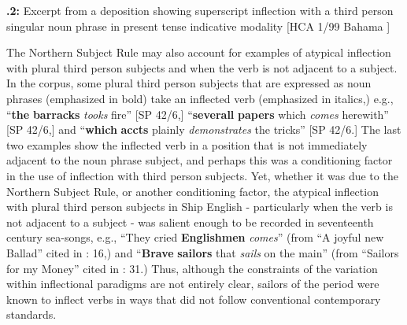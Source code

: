  

\textbf{.2:} Excerpt from a deposition showing superscript inflection with a third person singular noun phrase in present tense indicative modality [HCA 1/99 Bahama \citealt{Islands1722}]

The Northern Subject Rule may also account for examples of atypical inflection with plural third person subjects and when the verb is not adjacent to a subject. In the corpus, some plural third person subjects that are expressed as noun phrases (emphasized in bold) take an inflected verb (emphasized in italics,) e.g., “\textbf{the} \textbf{barracks} \textit{tooks} fire” [SP 42/6,] “\textbf{severall} \textbf{papers} which \textit{comes} herewith” [SP 42/6,] and “\textbf{which} \textbf{accts} plainly \textit{demonstrates} the tricks” [SP 42/6.] The last two examples show the inflected verb in a position that is not immediately adjacent to the noun phrase subject, and perhaps this was a conditioning factor in the use of inflection with third person subjects. Yet, whether it was due to the Northern Subject Rule, or another conditioning factor, the atypical inflection with plural third person subjects in Ship English - particularly when the verb is not adjacent to a subject - was salient enough to be recorded in seventeenth century sea-songs, e.g., “They cried \textbf{Englishmen} \textit{comes}” (from “A joyful new Ballad” cited in \citealt{Palmer1986}: 16,) and “\textbf{Brave} \textbf{sailors} that \textit{sails} on the main” (from “Sailors for my Money” cited in \citealt{Palmer1986}: 31.) Thus, although the constraints of the variation within inflectional paradigms are not entirely clear, sailors of the period were known to inflect verbs in ways that did not follow conventional contemporary standards. 

